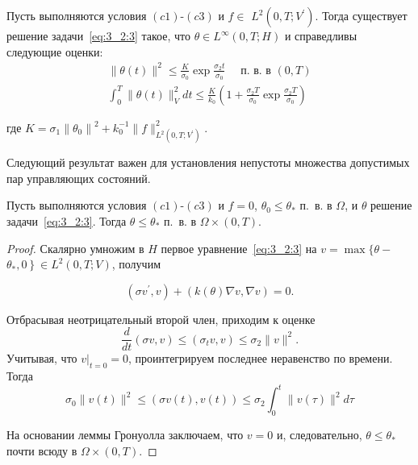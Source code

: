 \begin{lemma}
    \label{lm:3_2:1}
    Пусть выполняются условия $(c1)$-$(c3)$ и
    $f \in$ $L^{2}\left(0, T ; V^{\prime}\right)$.
    Тогда существует решение задачи~\eqref{eq:3_2:3} такое, что
    $\theta \in L^{\infty}(0, T ; H)$ и справедливы следующие оценки:
    \[
        \begin{gathered}
            \|\theta(t)\|^{2} \leq \frac{K}{\sigma_{0}} \exp \frac{\sigma_{2} t}{\sigma_{0}}
            \quad \text { п.\ в. в }(0, T) \\
            \int_{0}^{T}\|\theta(t)\|_{V}^{2} d t \leq
            \frac{K}{k_{0}}\left(1+\frac{\sigma_{2} T}{\sigma_{0}} \exp
            \frac{\sigma_{2} T}{\sigma_{0}}\right)
        \end{gathered}
    \]

    где $K=\sigma_{1}\left\|\theta_{0}\right\|^{2}
    + k_{0}^{-1}\|f\|_{L^{2}\left(0, T; V^{\prime}\right)}^{2}$.
\end{lemma}


Следующий результат важен для установления непустоты
множества допустимых пар управляющих состояний.

\begin{lemma}
    \label{lm:3_2:2}
    Пусть выполняются условия $(c1)$-$(c3)$ и
    $f=0$, $\theta_{0} \leq \theta_{*}$ п.\ в. в $\Omega$,
    и $\theta$ решение задачи~\eqref{eq:3_2:3}.
    Тогда $\theta \leq \theta_{*}$ п.\ в. в $\Omega \times(0, T)$.
\end{lemma}

\begin{proof}
    Скалярно умножим в $H$ первое уравнение~\eqref{eq:3_2:3} на
    $v=\max \{\theta-$ $\left.\theta_{*}, 0\right\} \in L^{2}(0, T ; V)$, получим

    \[ \left(\sigma v^{\prime}, v\right)+(k(\theta) \nabla v, \nabla v)=0. \]

    Отбрасывая неотрицательный второй член, приходим к оценке
    \[ \frac{d}{d t}(\sigma v, v) \leq\left(\sigma_{t} v, v\right) \leq \sigma_{2}\|v\|^{2}. \]
    Учитывая, что $\left.v\right|_{t=0}=0$, проинтегрируем
    последнее неравенство по времени.
    Тогда
    \[
        \sigma_{0}\|v(t)\|^{2} \leq(\sigma v(t), v(t))
        \leq \sigma_{2} \int_{0}^{t}\|v(\tau)\|^{2} d \tau
    \]

    На основании леммы Гронуолла заключаем,
    что $v=0$ и, следовательно, $\theta \leq \theta_{*}$ почти всюду в $\Omega\times(0,T)$.
\end{proof}

